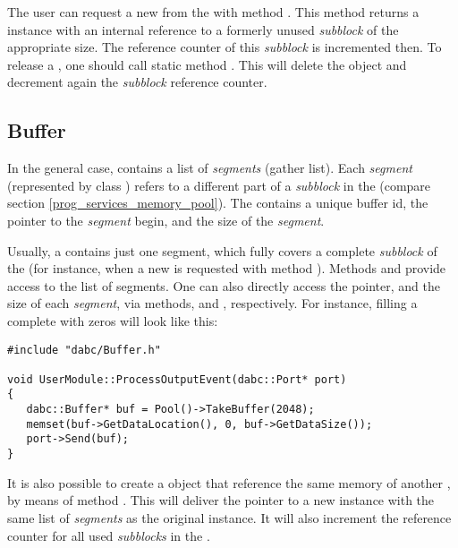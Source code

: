 The user can request a new  from the  with method . This method returns a  instance 
with an internal reference to a formerly unused {\em subblock} 
of the appropriate size. The reference counter of this {\em subblock} is incremented
then. To release a , one should call static method .  
This will delete the  object and decrement 
again the {\em subblock} reference counter.



\subsection{Buffer}
\label{prog_services_memory_buffer}
In the general case,  contains a list of {\em segments} (gather list).
Each {\em segment} (represented by class )
refers to a different part of a {\em subblock} in the 
(compare section \ref{prog_services_memory_pool}). The
 contains a unique buffer id, the pointer
to the {\em segment} begin, and the size of the {\em segment}. 



Usually, a  contains 
just one segment, which fully covers a complete {\em subblock} 
of the  (for instance, 
when a new  is requested with method ). 
Methods  and
 provide access to the list of segments. 
One can also directly access the pointer, and the size of each {\em segment}, via methods, and , respectively.
For instance, filling a complete  with zeros will look like this:  
 
\begin{small}
\begin{verbatim}     
#include "dabc/Buffer.h"

void UserModule::ProcessOutputEvent(dabc::Port* port)
{
   dabc::Buffer* buf = Pool()->TakeBuffer(2048);
   memset(buf->GetDataLocation(), 0, buf->GetDataSize());
   port->Send(buf);
}
\end{verbatim}     
\end{small}


It is also possible to create a  object that reference 
the same memory of another , by means of method
.
This will deliver the pointer to a new
 instance with the same list of {\em segments}
as the original instance. It will also
increment the reference counter for all used  
{\em subblocks} in the . 

